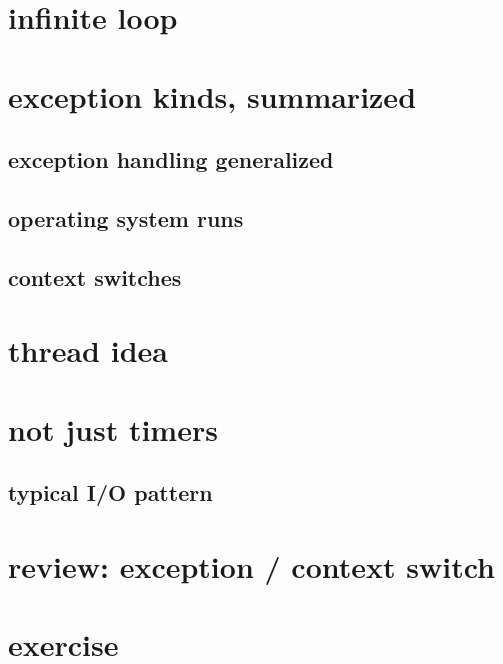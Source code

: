 \section{infinite loop}


\section{exception kinds, summarized}


\subsection{exception handling generalized}


\subsection{operating system runs}


\subsection{context switches} 


\section{thread idea}


\section{not just timers}

\subsection{typical I/O pattern}




\section{review: exception / context switch}


\section{exercise}


